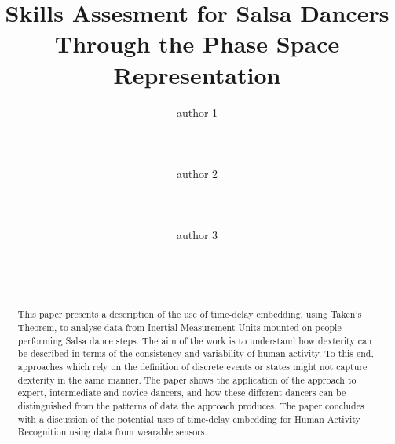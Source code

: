 \documentclass{sigchi}
\begin{document}
\title{Skills Assesment for Salsa Dancers \\
Through the Phase Space Representation}

\author{
  \alignauthor author 1\\
    \\
    \\
    \\
  \alignauthor author 2\\ %
    \\
    \\
    \\
  \alignauthor author 3\\ %
    \\
    \\
    \\
}

\maketitle

\begin{abstract}
This paper presents a description of the use of time-delay embedding, using Taken's Theorem, 
to analyse data from Inertial Measurement Units mounted on people performing Salsa dance steps.  
The aim of the work is to understand how dexterity can be described in terms of the consistency 
and variability of human activity. To this end, approaches which rely on the definition of 
discrete events or states might not capture dexterity in the same manner. 
The paper shows the application of the approach to expert, intermediate and novice dancers, 
and how these different dancers can be distinguished from the patterns of data the approach produces. 
The paper concludes with a discussion of the potential uses of time-delay embedding for 
Human Activity Recognition using data from wearable sensors.


\end{abstract}
\end{document}
